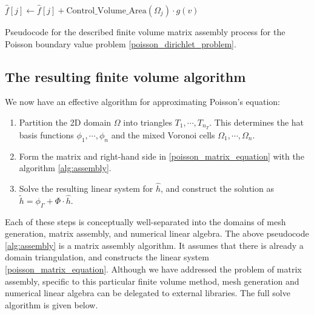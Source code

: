 \begin{algorithm}
{{{{            }
        }
        $\hat{f}[j] \leftarrow \hat{f}[j] + \text{Control\_Volume\_Area}(\Omega_j)\cdot g(v)$\;
    }
    \;
}
    \caption{Pseudocode for the described finite volume matrix assembly process for the Poisson boundary value problem \eqref{poisson_dirichlet_problem}.}
\end{algorithm}
\newpage

\subsection{The resulting finite volume algorithm}
We now have an effective algorithm for approximating Poisson's equation:
\begin{enumerate}
    \item Partition the 2D domain $\Omega$ into triangles $T_1,\cdots,T_{n_T}$. This determines the hat basis functions $\phi_1,\cdots,\phi_n$
         and the mixed Voronoi cells $\Omega_1,\cdots,\Omega_n$.
    \item Form the matrix and right-hand side in \eqref{poisson_matrix_equation} with the algorithm \ref{alg:assembly}.
    \item Solve the resulting linear system for $\hat{h}$, and construct the solution as $\tilde{h} = \phi_\Gamma + \Phi\cdot\hat{h}$.
\end{enumerate}
Each of these steps is conceptually well-separated into the domains of
mesh generation, matrix assembly, and numerical linear algebra. The above pseudocode \ref{alg:assembly} is a matrix assembly algorithm.
It assumes that there is already a domain triangulation, and constructs the linear system \eqref{poisson_matrix_equation}.
Although we have addressed the
problem of matrix assembly, specific to this particular finite volume method, mesh generation and numerical linear algebra can be delegated to external libraries.
The full solve algorithm is given below.

